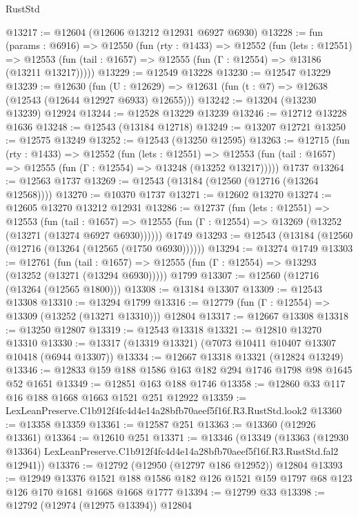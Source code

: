 \begin{lexlean}{RustStd}
\begin{coremodule}
@13217 := @12604 (@12606 @13212 @12931 @6927 @6930)
@13228 := fun (params : @6916) =>
  @12550
    (fun (rty : @1433) =>
    @12552
      (fun (lets : @12551) =>
      @12553 (fun (tail : @1657) => @12555 (fun (Γ : @12554) => @13186 (@13211 @13217)))))
@13229 := @12549 @13228
@13230 := @12547 @13229
@13239 := @12630
    (fun (U : @12629) => @12631 (fun (t : @7) => @12638 (@12543 (@12644 @12927 @6933) @12655)))
@13242 := @13204 (@13230 @13239) @12924
@13244 := @12528 @13229 @13239
@13246 := @12712 @13228 @1636
@13248 := @12543 (@13184 @12718)
@13249 := @13207 @12721
@13250 := @12575 @13249
@13252 := @12543 (@13250 @12595)
@13263 := @12715
    (fun (rty : @1433) =>
    @12552
      (fun (lets : @12551) =>
      @12553 (fun (tail : @1657) => @12555 (fun (Γ : @12554) => @13248 (@13252 @13217)))))
    @1737
@13264 := @12563 @1737
@13269 := @12543 (@13184 (@12560 (@12716 (@13264 @12568))))
@13270 := @10370 @1737
@13271 := @12602 @13270
@13274 := @12605 @13270 @13212 @12931
@13286 := @12737
    (fun (lets : @12551) =>
    @12553
      (fun (tail : @1657) =>
      @12555 (fun (Γ : @12554) => @13269 (@13252 (@13271 (@13274 @6927 @6930))))))
    @1749
@13293 := @12543 (@13184 (@12560 (@12716 (@13264 (@12565 (@1750 @6930))))))
@13294 := @13274 @1749
@13303 := @12761
    (fun (tail : @1657) => @12555 (fun (Γ : @12554) => @13293 (@13252 (@13271 (@13294 @6930)))))
    @1799
@13307 := @12560 (@12716 (@13264 (@12565 @1800)))
@13308 := @13184 @13307
@13309 := @12543 @13308
@13310 := @13294 @1799
@13316 := @12779 (fun (Γ : @12554) => @13309 (@13252 (@13271 @13310))) @12804
@13317 := @12667 @13308
@13318 := @13250 @12807
@13319 := @12543 @13318
@13321 := @12810 @13270 @13310
@13330 := @13317 (@13319 @13321) (@7073 @10411 @10407 @13307 @10418 (@6944 @13307))
@13334 := @12667 @13318 @13321 (@12824 @13249)
@13346 := @12833 @159 @188 @1586 @163 @182 @294 @1746 @1798 @98 @1645 @52 @1651
@13349 := @12851 @163 @188 @1746
@13358 := @12860 @33 @117 @16 @188 @1668 @1663 @1521 @251 @12922
@13359 := LexLeanPreserve.C1b912f4fc4d4e14a28bfb70aeef5f16f.R3.RustStd.look2
@13360 := @13358 @13359
@13361 := @12587 @251
@13363 := @13360 (@12926 @13361)
@13364 := @12610 @251
@13371 := @13346
    (@13349
      (@13363
        (@12930 @13364)
        LexLeanPreserve.C1b912f4fc4d4e14a28bfb70aeef5f16f.R3.RustStd.fal2
        @12941))
@13376 := @12792 (@12950 (@12797 @186 @12952)) @12804
@13393 := @12949
    @13376
    @1521
    @188
    @1586
    @182
    @126
    @1521
    @159
    @1797
    @68
    @123
    @126
    @170
    @1681
    @1668
    @1668
    @1777
@13394 := @12799 @33
@13398 := @12792 (@12974 (@12975 @13394)) @12804

\end{coremodule}
\end{lexlean}
